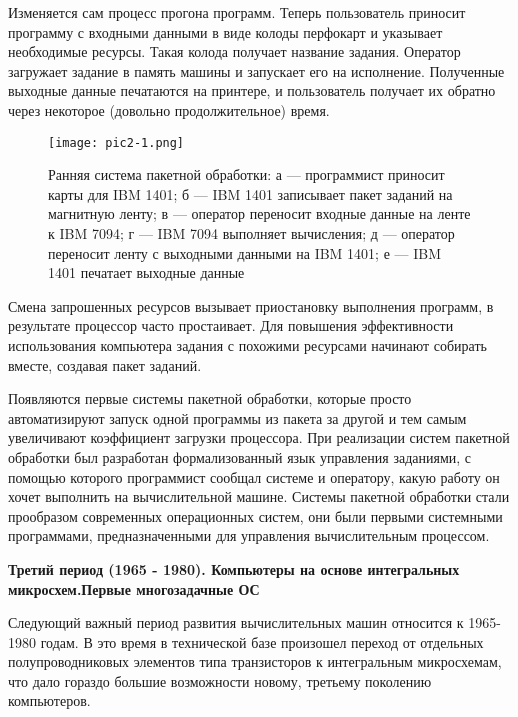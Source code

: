 Изменяется сам процесс прогона программ. Теперь пользователь приносит программу с входными данными в виде колоды перфокарт и указывает необходимые ресурсы. Такая колода получает название задания. Оператор загружает задание в память машины и запускает его на исполнение. Полученные выходные данные печатаются на принтере, и пользователь получает их обратно через некоторое (довольно продолжительное) время.
\begin{figure}\center
   \texttt{[image: pic2-1.png]}
   \caption{Ранняя система пакетной обработки: а — программист приносит карты для IBM 1401; б — IBM 1401 записывает пакет заданий на магнитную ленту; в — оператор переносит входные данные на ленте к IBM 7094; г — IBM 7094 выполняет вычисления; д — оператор переносит ленту с выходными данными на IBM 1401; е — IBM 1401 печатает выходные данные}
\end{figure}

Смена запрошенных ресурсов вызывает приостановку выполнения программ, в результате процессор часто простаивает. Для повышения эффективности использования компьютера задания с похожими ресурсами начинают собирать вместе, создавая пакет заданий.

Появляются первые системы пакетной обработки, которые просто автоматизируют запуск одной программы из пакета за другой и тем самым увеличивают коэффициент загрузки процессора. При реализации систем пакетной обработки был разработан формализованный язык управления заданиями, с помощью которого программист сообщал системе и оператору, какую работу он хочет выполнить на вычислительной машине. Системы пакетной обработки стали прообразом современных операционных систем, они были первыми системными программами, предназначенными для управления вычислительным процессом.

\textbf{Третий период (1965 - 1980). Компьютеры на основе интегральных микросхем.Первые многозадачные ОС}

Следующий важный период развития вычислительных машин относится к 1965-1980 годам. В это время в технической базе произошел переход от отдельных полупроводниковых элементов типа транзисторов к интегральным микросхемам, что дало гораздо большие возможности новому, третьему поколению компьютеров.

